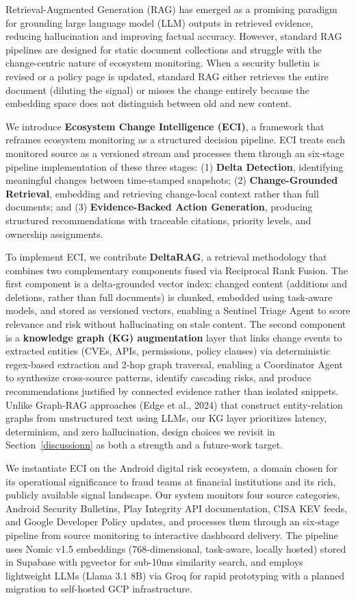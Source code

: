 \documentclass[
]{article}
\begin{document}
Retrieval-Augmented Generation (RAG) has emerged as a promising paradigm
for grounding large language model (LLM) outputs in retrieved evidence,
reducing hallucination and improving factual accuracy. However, standard
RAG pipelines are designed for static document collections and struggle
with the change-centric nature of ecosystem monitoring. When a security
bulletin is revised or a policy page is updated, standard RAG either
retrieves the entire document (diluting the signal) or misses the change
entirely because the embedding space does not distinguish between old
and new content.

We introduce \textbf{Ecosystem Change Intelligence (ECI)}, a framework
that reframes ecosystem monitoring as a structured decision pipeline.
ECI treats each monitored source as a versioned stream and processes them through an six-stage pipeline implementation
of these three stages: (1) \textbf{Delta Detection}, identifying
meaningful changes between time-stamped snapshots; (2)
\textbf{Change-Grounded Retrieval}, embedding and retrieving
change-local context rather than full documents; and (3)
\textbf{Evidence-Backed Action Generation}, producing structured
recommendations with traceable citations, priority levels, and ownership
assignments.

To implement ECI, we contribute \textbf{DeltaRAG}, a retrieval
methodology that combines two complementary components fused via
Reciprocal Rank Fusion. The first component is a delta-grounded vector
index: changed content (additions and deletions, rather than full
documents) is chunked, embedded using task-aware models, and stored as
versioned vectors, enabling a Sentinel Triage Agent to score relevance
and risk without hallucinating on stale content. The second component
is a \textbf{knowledge graph (KG) augmentation} layer that links change
events to extracted entities (CVEs, APIs, permissions, policy clauses)
via deterministic regex-based extraction and 2-hop graph traversal,
enabling a Coordinator Agent to synthesize cross-source patterns,
identify cascading risks, and produce recommendations justified by
connected evidence rather than isolated snippets. Unlike Graph-RAG
approaches (Edge et al., 2024) that construct entity-relation graphs
from unstructured text using LLMs, our KG layer prioritizes latency,
determinism, and zero hallucination, design choices we revisit in
Section~\ref{discussionn} as both a strength and a future-work target.

We instantiate ECI on the Android digital risk ecosystem, a domain
chosen for its operational significance to fraud teams at financial
institutions and its rich, publicly available signal landscape. Our
system monitors four source categories, Android Security Bulletins,
Play Integrity API documentation, CISA KEV feeds, and Google Developer
Policy updates, and processes them through an six-stage pipeline
from source monitoring to interactive dashboard delivery. The pipeline
uses Nomic v1.5 embeddings (768-dimensional, task-aware, locally
hosted) stored in Supabase with pgvector for sub-10ms similarity
search, and employs lightweight LLMs (Llama 3.1 8B) via Groq for
rapid prototyping with a planned migration to self-hosted GCP
infrastructure.
\end{document}
